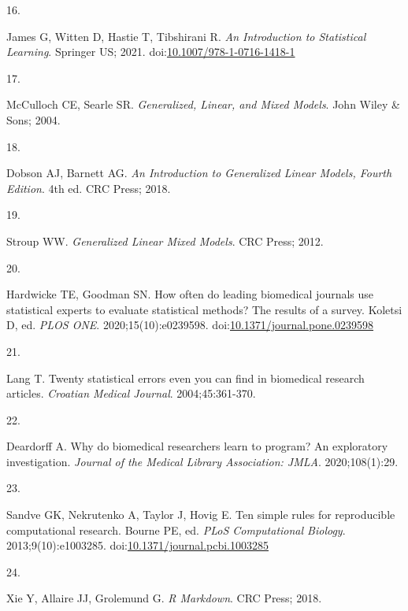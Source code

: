 \documentclass[smallextended]{svjour3}       %
\newlength{\cslhangindent}
\newlength{\csllabelwidth}
\newlength{\cslentryspacingunit} %
\newenvironment{CSLReferences}[2] %
 {%
  \setlength{\parindent}{0pt}
  \ifodd #1
  \let\oldpar\par
  \def\par{\hangindent=\cslhangindent\oldpar}
  \fi
  \setlength{\parskip}{#2\cslentryspacingunit}
 }%
 {}
\newcommand{\CSLLeftMargin}[1]{\parbox[t]{\csllabelwidth}{#1}}
\newcommand{\CSLRightInline}[1]{\parbox[t]{\linewidth - \csllabelwidth}{#1}\break}
\begin{document}
\begin{CSLReferences}{0}{0}
\leavevmode{}%
\CSLLeftMargin{16. }%
\CSLRightInline{James G, Witten D, Hastie T, Tibshirani R. \emph{An
Introduction to Statistical Learning}. Springer {US}; 2021.
doi:\href{https://doi.org/10.1007/978-1-0716-1418-1}{10.1007/978-1-0716-1418-1}}

\leavevmode{}%
\CSLLeftMargin{17. }%
\CSLRightInline{McCulloch CE, Searle SR. \emph{Generalized, Linear, and
Mixed Models}. John Wiley \& Sons; 2004.}

\leavevmode{}%
\CSLLeftMargin{18. }%
\CSLRightInline{Dobson AJ, Barnett AG. \emph{An Introduction to
Generalized Linear Models, Fourth Edition}. 4th ed. CRC Press; 2018.}

\leavevmode{}%
\CSLLeftMargin{19. }%
\CSLRightInline{Stroup WW. \emph{Generalized Linear Mixed Models}. CRC
Press; 2012.}

\leavevmode{}%
\CSLLeftMargin{20. }%
\CSLRightInline{Hardwicke TE, Goodman SN. How often do leading
biomedical journals use statistical experts to evaluate statistical
methods? The results of a survey. Koletsi D, ed. \emph{{PLOS} {ONE}}.
2020;15(10):e0239598.
doi:\href{https://doi.org/10.1371/journal.pone.0239598}{10.1371/journal.pone.0239598}}

\leavevmode{}%
\CSLLeftMargin{21. }%
\CSLRightInline{Lang T. Twenty statistical errors even you can find in
biomedical research articles. \emph{Croatian Medical Journal}.
2004;45:361-370.}

\leavevmode{}%
\CSLLeftMargin{22. }%
\CSLRightInline{Deardorff A. Why do biomedical researchers learn to
program? An exploratory investigation. \emph{Journal of the Medical
Library Association: JMLA}. 2020;108(1):29.}

\leavevmode{}%
\CSLLeftMargin{23. }%
\CSLRightInline{Sandve GK, Nekrutenko A, Taylor J, Hovig E. Ten simple
rules for reproducible computational research. Bourne PE, ed.
\emph{{PLoS} Computational Biology}. 2013;9(10):e1003285.
doi:\href{https://doi.org/10.1371/journal.pcbi.1003285}{10.1371/journal.pcbi.1003285}}

\leavevmode{}%
\CSLLeftMargin{24. }%
\CSLRightInline{Xie Y, Allaire JJ, Grolemund G. \emph{{R} Markdown}. CRC
Press; 2018.}


\end{CSLReferences}
\end{document}
